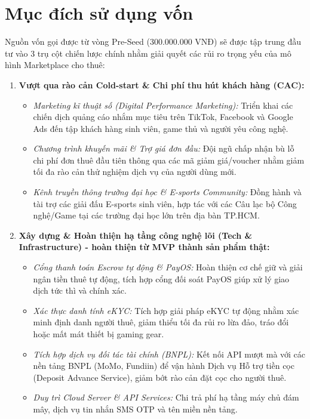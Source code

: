 \section{Mục đích sử dụng vốn}

Nguồn vốn gọi được từ vòng Pre-Seed (300.000.000 VNĐ) sẽ được tập trung đầu tư vào 3 trụ cột chiến lược chính nhằm giải quyết các rủi ro trọng yếu của mô hình Marketplace cho thuê:

\begin{enumerate}
    \item \textbf{Vượt qua rào cản Cold-start \& Chi phí thu hút khách hàng (CAC):}
    \begin{itemize}
        \item \textit{Marketing kĩ thuật số (Digital Performance Marketing):} Triển khai các chiến dịch quảng cáo nhắm mục tiêu trên TikTok, Facebook và Google Ads đến tập khách hàng sinh viên, game thủ và người yêu công nghệ.
        \item \textit{Chương trình khuyến mãi \& Trợ giá đơn đầu:} Đội ngũ chấp nhận bù lỗ chi phí đơn thuê đầu tiên thông qua các mã giảm giá/voucher nhằm giảm tối đa rào cản thử nghiệm dịch vụ của người dùng mới.
        \item \textit{Kênh truyền thông trường đại học \& E-sports Community:} Đồng hành và tài trợ các giải đấu E-sports sinh viên, hợp tác với các Câu lạc bộ Công nghệ/Game tại các trường đại học lớn trên địa bàn TP.HCM.
    \end{itemize}

    \item \textbf{Xây dựng \& Hoàn thiện hạ tầng công nghệ lõi (Tech \& Infrastructure) - hoàn thiện từ MVP thành sản phẩm thật:}
    \begin{itemize}
        \item \textit{Cổng thanh toán Escrow tự động \& PayOS:} Hoàn thiện cơ chế giữ và giải ngân tiền thuê tự động, tích hợp cổng đối soát PayOS giúp xử lý giao dịch tức thì và chính xác.
        \item \textit{Xác thực danh tính eKYC:} Tích hợp giải pháp eKYC tự động nhằm xác minh định danh người thuê, giảm thiểu tối đa rủi ro lừa đảo, tráo đổi hoặc mất mát thiết bị gaming gear.
        \item \textit{Tích hợp dịch vụ đối tác tài chính (BNPL):} Kết nối API mượt mà với các nền tảng BNPL (MoMo, Fundiin) để vận hành Dịch vụ Hỗ trợ tiền cọc (Deposit Advance Service), giảm bớt rào cản đặt cọc cho người thuê.
        \item \textit{Duy trì Cloud Server \& API Services:} Chi trả phí hạ tầng máy chủ đám mây, dịch vụ tin nhắn SMS OTP và tên miền nền tảng.
    \end{itemize}


\end{enumerate}
